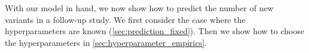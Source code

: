 With our model in hand, we now show how to predict the number of new variants in a follow-up study. We first consider the case where the hyperparameters are known (\cref{sec:prediction_fixed}). Then we show how to choose the hyperparameters in \cref{sec:hyperparameter_empirics}.